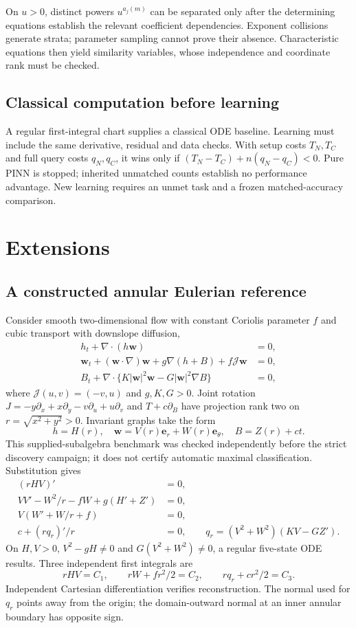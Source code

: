 \documentclass[11pt,a4paper,oneside]{report}
\numberwithin{equation}{chapter}
\begin{document}
On $u>0$, distinct powers $u^{a_j(m)}$ can be separated only after the determining equations establish the relevant coefficient dependencies. Exponent collisions generate strata; parameter sampling cannot prove their absence. Characteristic equations then yield similarity variables, whose independence and coordinate rank must be checked.

\section{Classical computation before learning}
A regular first-integral chart supplies a classical ODE baseline. Learning must include the same derivative, residual and data checks. With setup costs $T_N,T_C$ and full query costs $q_N,q_C$, it wins only if $(T_N-T_C)+n(q_N-q_C)<0$. Pure PINN is stopped; inherited unmatched counts establish no performance advantage. New learning requires an unmet task and a frozen matched-accuracy comparison.
\chapter{Extensions}\label{ch:outlook}
\section{A constructed annular Eulerian reference}\label{sec:2d}
Consider smooth two-dimensional flow with constant Coriolis parameter $f$ and cubic transport with downslope diffusion,
\begin{align}
h_t+\nabla\!\cdot(h\mathbf w)&=0,\\
\mathbf w_t+(\mathbf w\!\cdot\nabla)\mathbf w+g\nabla(h+B)+f\mathcal J\mathbf w&=0,\\
B_t+\nabla\!\cdot\{K|\mathbf w|^2\mathbf w-G|\mathbf w|^2\nabla B\}&=0,
\end{align}
where $\mathcal J(u,v)=(-v,u)$ and $g,K,G>0$. Joint rotation
$J=-y\partial_x+x\partial_y-v\partial_u+u\partial_v$ and $T+c\partial_B$ have projection rank two on $r=\sqrt{x^2+y^2}>0$. Invariant graphs take the form
\begin{equation}h=H(r),\quad\mathbf w=V(r)\mathbf e_r+W(r)\mathbf e_\theta,\quad B=Z(r)+ct.\end{equation}
This supplied-subalgebra benchmark was checked independently before the strict discovery campaign; it does not certify automatic maximal classification. Substitution gives
\begin{align}
(rHV)'&=0,\\
VV'-W^2/r-fW+g(H'+Z')&=0,\\
V(W'+W/r+f)&=0,\\
c+(rq_r)'/r&=0,\qquad q_r=(V^2+W^2)(KV-GZ').
\end{align}
On $H,V>0$, $V^2-gH\ne0$ and $G(V^2+W^2)\ne0$, a regular five-state ODE results. Three independent first integrals are
\begin{equation}rHV=C_1,\qquad rW+fr^2/2=C_2,\qquad rq_r+cr^2/2=C_3.\end{equation}
Independent Cartesian differentiation verifies reconstruction. The normal used for $q_r$ points away from the origin; the domain-outward normal at an inner annular boundary has opposite sign.
\end{document}
